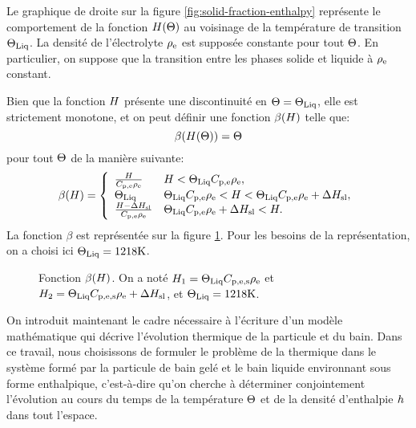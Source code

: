 Le graphique de droite sur la figure \ref{fig:solid-fraction-enthalpy}
représente le comportement de la fonction $H(\Theta)$ au
voisinage de la température de transition $\Theta_\text{Liq}$. La densité de
l'électrolyte $\rho_\mathrm{e}$ est supposée constante pour tout
$\Theta$. En particulier, on suppose que la transition entre les
phases solide et liquide à $\rho_\mathrm{e}$ constant.

Bien que la fonction $H$ présente une discontinuité en
$\Theta = \Theta_\text{Liq}$, elle est strictement monotone, et on peut
définir une fonction $\beta(H)$ telle que:
\begin{equation}
\beta(H(\Theta)) = \Theta
\end{equation}
pour tout $\Theta$ de la manière suivante:
\begin{equation}
  \beta(\enthalpy) = \left\{
  \begin{array}{ll}
    \frac{\enthalpy}{\electrolytehc\electrolytedensity} %
      & \enthalpy < \tliq \electrolytehc\electrolytedensity,\\
    \tliq %
      & \tliq \electrolytehc\electrolytedensity < \enthalpy < \tliq \electrolytehc\electrolytedensity + \fusionenthalpy,\\
    \frac{\enthalpy - \fusionenthalpy}{\electrolytehc\electrolytedensity} %
      & \tliq\electrolytehc\electrolytedensity + \fusionenthalpy < \enthalpy.\\
  \end{array}
  \right.
\end{equation}
La fonction $\beta$ est représentée sur la figure \ref{fig:beta}. Pour
les besoins de la représentation, on a choisi ici $\Theta_\text{Liq} = 1218\si{\kelvin}$.
\begin{figure}
  \begin{center}
    
    \caption{Fonction $\beta(H)$. On a noté $H_1 =
      \Theta_\text{Liq}C_{\mathrm{p,e,s}}\rho_\mathrm{e}$ et $H_2 =
      \Theta_\text{Liq}C_{\mathrm{p,e,s}}\rho_\mathrm{e} + \Delta H_\mathrm{sl}$, et
      $\Theta_\text{Liq} = 1218\si{\kelvin}$.}
    \label{fig:beta}
  \end{center}
\end{figure}

On introduit maintenant le cadre nécessaire à l'écriture d'un modèle
mathématique qui décrive l'évolution thermique de la particule et du
bain. Dans ce travail, nous choisissons de formuler le problème de la
thermique dans le système formé par la particule de bain gelé et le
bain liquide environnant sous forme enthalpique, c'est-à-dire qu'on
cherche à déterminer conjointement l'évolution au cours du temps de la
température $\Theta$ et de la densité d'enthalpie
$h$ dans tout l'espace.

